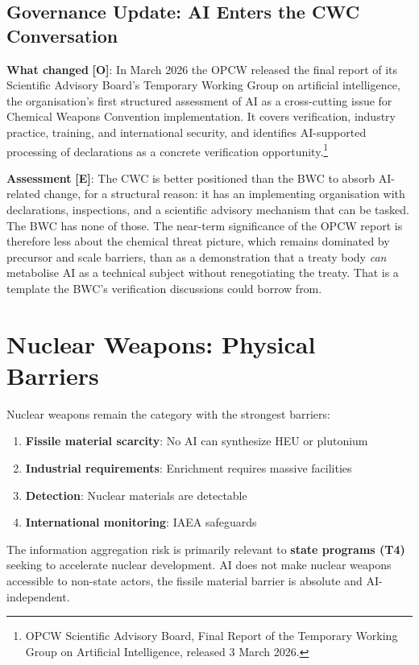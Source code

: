\documentclass[11pt,letterpaper]{article}
\begin{document}
\subsection{Governance Update: AI Enters the CWC Conversation}

\textbf{What changed} \textbf{[O]}: In March 2026 the OPCW released the final report of its Scientific Advisory Board's Temporary Working Group on artificial intelligence, the organisation's first structured assessment of AI as a cross-cutting issue for Chemical Weapons Convention implementation. It covers verification, industry practice, training, and international security, and identifies AI-supported processing of declarations as a concrete verification opportunity.\footnote{OPCW Scientific Advisory Board, Final Report of the Temporary Working Group on Artificial Intelligence, released 3 March 2026.}

\textbf{Assessment} \textbf{[E]}: The CWC is better positioned than the BWC to absorb AI-related change, for a structural reason: it has an implementing organisation with declarations, inspections, and a scientific advisory mechanism that can be tasked. The BWC has none of those. The near-term significance of the OPCW report is therefore less about the chemical threat picture, which remains dominated by precursor and scale barriers, than as a demonstration that a treaty body \textit{can} metabolise AI as a technical subject without renegotiating the treaty. That is a template the BWC's verification discussions could borrow from.

\section{Nuclear Weapons: Physical Barriers}

Nuclear weapons remain the category with the strongest barriers:
\begin{enumerate}
  \item \textbf{Fissile material scarcity}: No AI can synthesize HEU or plutonium
  \item \textbf{Industrial requirements}: Enrichment requires massive facilities
  \item \textbf{Detection}: Nuclear materials are detectable
  \item \textbf{International monitoring}: IAEA safeguards
\end{enumerate}

\begin{infobox}
The information aggregation risk is primarily relevant to \textbf{state programs (T4)} seeking to accelerate nuclear development. AI does not make nuclear weapons accessible to non-state actors, the fissile material barrier is absolute and AI-independent.
\end{infobox}
\end{document}
